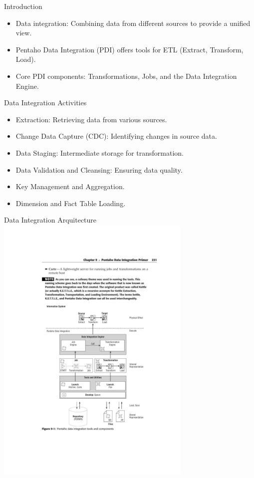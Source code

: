 \documentclass{beamer}
\begin{document}
\begin{frame}{Introduction}
    \begin{itemize}
        \item Data integration: Combining data from different sources to provide a unified view.
        \item Pentaho Data Integration (PDI) offers tools for ETL (Extract, Transform, Load).
        \item Core PDI components: Transformations, Jobs, and the Data Integration Engine.
    \end{itemize}
\end{frame}

\begin{frame}{Data Integration Activities}
    \begin{itemize}
        \item Extraction: Retrieving data from various sources.
        \item Change Data Capture (CDC): Identifying changes in source data.
        \item Data Staging: Intermediate storage for transformation.
        \item Data Validation and Cleansing: Ensuring data quality.
        \item Key Management and Aggregation.
        \item Dimension and Fact Table Loading.
    \end{itemize}
\end{frame}

\begin{frame}{Data Integration Arquitecture}
    \centering
    \includegraphics[width=0.7\textwidth, trim={3cm 5.6cm 3cm 10cm}, clip]{figures/pdi_architecture}
\end{frame}
\end{document}
